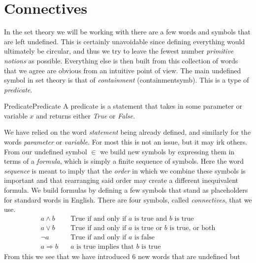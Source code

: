 \section{Connectives}
    In the set theory we will be working with there are a few words and symbols
    that are left undefined. This is certainly unavoidable since defining
    everything would ultimately be circular, and thus we try to leave the fewest
    number \textit{primitive notions} as possible. Everything else is then built
    from this collection of words that we agree are obvious from an intuitive
    point of view. The main undefined symbol in set theory is that of
    \textit{containment} (\gls{containmentsymb}). This is
    a type of \textit{\gls{predicate}}.
    \begin{fdefinition}{Predicate}{Predicate}
        A \gls{predicate} is a statement that takes in some parameter or
        variable $x$ and returns either \textit{True} or \textit{False}.
    \end{fdefinition}
    We have relied on the word \textit{statement} being already defined, and
    similarly for the words \textit{parameter} or \textit{variable}. For most
    this is not an issue, but it may irk others. From our undefined symbol $\in$
    we build new symbols by expressing them in terms of a
    \textit{formula}, which is simply a finite
    sequence of symbols. Here the word \textit{sequence} is meant to imply that
    the \textit{order} in which we combine these symbols is important and that
    rearranging said order may create a different inequivalent formula. We build
    formulas by defining a few symbols that stand as placeholders for standard
    words in English. There are four symbols, called
    \textit{\glspl{connective}}, that we use.
    \begin{align*}
        a\land{b}\quad
        &\textrm{True if and only if }a
        \textrm{ is true and }b\textrm{ is true}
        \tag{Conjunction}\\
        a\lor{b}\quad
        &\textrm{True if and only if }a
        \textrm{ is true or }b\textrm{ is true, or both}
        \tag{Disjunction}\\
        \neg{a}\quad
        &\textrm{True if and only if }a\textrm{ is false}
        \tag{Negation}\\
        a\Rightarrow{b}\quad
        &a\textrm{ is true implies that }b\textrm{ is true}
        \tag{Implication}
    \end{align*}
    From this we see that we have introduced 6 new words that are undefined but
